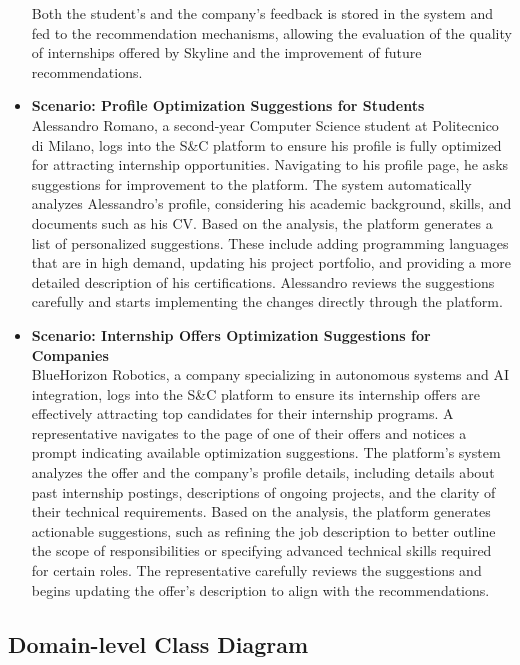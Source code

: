 \begin{itemize}
        Both the student's and the company’s feedback is stored in the system and fed to the recommendation mechanisms, allowing the evaluation of the quality of internships offered by Skyline and the improvement of future recommendations. 
        \incscenario
    \item \textbf{\nth{\thescenario} Scenario: Profile Optimization Suggestions for Students}
    \\
        Alessandro Romano, a second-year Computer Science student at Politecnico di Milano, logs into the S\&C platform to ensure his profile is fully optimized for attracting internship opportunities. Navigating to his profile page, he asks suggestions for improvement to the platform.
        The system automatically analyzes Alessandro’s profile, considering his academic background, skills, and documents such as his CV. Based on the analysis, the platform generates a list of personalized suggestions. These include adding programming languages that are in high demand, updating his project portfolio, and providing a more detailed description of his certifications.
        Alessandro reviews the suggestions carefully and starts implementing the changes directly through the platform.
        \incscenario
    \item \textbf{\nth{\thescenario} Scenario: Internship Offers Optimization Suggestions for Companies}
    \\
        BlueHorizon Robotics, a company specializing in autonomous systems and AI integration, logs into the S\&C platform to ensure its internship offers are effectively attracting top candidates for their internship programs. A representative navigates to the page of one of their offers and notices a prompt indicating available optimization suggestions.
        The platform’s system analyzes the offer and the company's profile details, including details about past internship postings, descriptions of ongoing projects, and the clarity of their technical requirements. Based on the analysis, the platform generates actionable suggestions, such as refining the job description to better outline the scope of responsibilities or specifying advanced technical skills required for certain roles.
        The representative carefully reviews the suggestions and begins updating the offer's description to align with the recommendations.
        \incscenario
\end{itemize}

\subsection{Domain-level Class Diagram}
\label{subsec:domain_level_class_diagrams}

